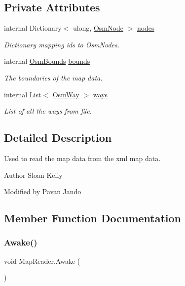\subsection*{Private Attributes}
\begin{DoxyCompactItemize}
\item 
internal Dictionary$<$ ulong, \mbox{\hyperlink{class_osm_node}{Osm\+Node}} $>$ \mbox{\hyperlink{class_map_reader_a78e9d00aa1f8cb21772e2f9453002d8e}{nodes}}
\begin{DoxyCompactList}\small\item\em Dictionary mapping ids to Osm\+Nodes. \end{DoxyCompactList}\item 
internal \mbox{\hyperlink{class_osm_bounds}{Osm\+Bounds}} \mbox{\hyperlink{class_map_reader_a9cc55dac60d0505e98e0161f8cf103ec}{bounds}}
\begin{DoxyCompactList}\small\item\em The boundaries of the map data. \end{DoxyCompactList}\item 
internal List$<$ \mbox{\hyperlink{class_osm_way}{Osm\+Way}} $>$ \mbox{\hyperlink{class_map_reader_a785edd952542f996b0897dc8b4bde67b}{ways}}
\begin{DoxyCompactList}\small\item\em List of all the ways from file. \end{DoxyCompactList}\end{DoxyCompactItemize}


\subsection{Detailed Description}
Used to read the map data from the xml map data. 

\begin{DoxyAuthor}{Author}
Sloan Kelly 

Modified by Pavan Jando
\end{DoxyAuthor}


\subsection{Member Function Documentation}
\mbox{\label{class_map_reader_abd81ae4208520c05740a0c6e9123f0c7}} 
\subsubsection{\texorpdfstring{Awake()}{Awake()}}
{\footnotesize\ttfamily void Map\+Reader.\+Awake (\begin{DoxyParamCaption}{ }\end{DoxyParamCaption})\hspace{0.3cm}{\ttfamily [private]}}



